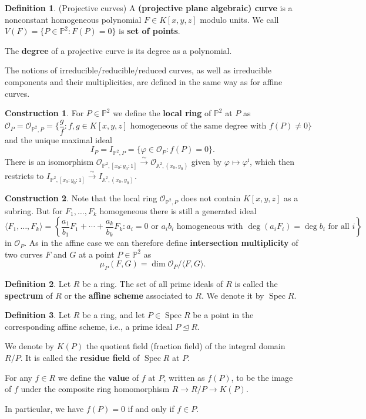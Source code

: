 \documentclass[12pt]{article}
\newlength{\myparskip}
\newenvironment{fullbox}{\begin{lrbox}{\savefullbox}\begin{minipage}{\dimexpr\textwidth-2\fboxsep\relax}\setlength{\parskip}{\myparskip}}{\end{minipage}\end{lrbox}\framebox[\textwidth]{\usebox{\savefullbox}}}
\theoremstyle{definition}
\newtheorem{defn}{Definition}
\newtheorem{construction}{Construction}
\newenvironment{bdefn}{\begin{fullbox}\begin{defn}}{\end{defn}\end{fullbox}}
\renewcommand{\phi}{\varphi}
\newcommand{\<}{\langle}
\renewcommand{\>}{\rangle}
\newcommand{\A}{\mathbb{A}}
\renewcommand{\P}{\mathbb{P}}
\renewcommand{\O}{\mathscr{O}}
\newcommand{\teq}{\trianglelefteq}
\DeclareMathOperator{\Spec}{Spec}
\begin{document}
\begin{defn}(Projective curves)
    A \textbf{(projective plane algebraic) curve} is a nonconstant homogeneous polynomial $F \in K[x, y, z]$ modulo units. We call $V(F) = \{P \in \P^2 : F(P) = 0\}$ is \textbf{set of points}.

    The \textbf{degree} of a projective curve is its degree as a polynomial.

    The notions of irreducible/reducible/reduced curves, as well as irreducible components and their multiplicities, are defined in the same way as for affine curves. 
\end{defn}


\begin{construction}
    For $P \in \P^2$ we define the \textbf{local ring} of $\P^2$ at $P$ as
    \[
        \O_P = \O_{\P^2, P} = \{\frac{g}{f} : f, g \in K[x, y, z] \text{ homogeneous of the same degree with } f(P) \ne 0\}
    \]
    and the unique maximal ideal
    \[
        I_P = I_{\P^2, P} = \{\phi \in \O_P : f(P) = 0\}.
    \]
    There is an isomorphism $\O_{\P^2, [x_0 : y_0 : 1]} \xrightarrow{\sim} \O_{\A^2, (x_0, y_0)}$ given by $\phi \mapsto \phi^{\mathrm{i}}$, which then restricts to $I_{\P^2, [x_0 : y_0 : 1]} \xrightarrow{\sim} I_{\A^2, (x_0, y_0)}$.
\end{construction}




\begin{construction}
    Note that the local ring $\O_{\P^2, P}$ does not contain $K[x, y, z]$ as a subring. But for $F_1, \dots, F_k$ homogeneous there is still a generated ideal
    \[
        \<F_1, \dots, F_k\> = \left\{\frac{a_1}{b_1}F_1 + \cdots + \frac{a_k}{b_k}F_k : a_i = 0 \text{ or $a_ib_i$ homogeneous with $\deg(a_iF_i) = \deg b_i$ for all $i$}\right\}
    \]
    in $\O_P$. As in the affine case we can therefore define \textbf{intersection multiplicity} of two curves $F$ and $G$ at a point $P \in \P^2$ as
    \[
        \mu_P(F, G) = \dim \O_P/\<F, G\>.
    \]
\end{construction}


\newpage



\begin{bdefn}
    Let $R$ be a ring. The set of all prime ideals of $R$ is called the \textbf{spectrum} of $R$ or the \textbf{affine scheme} associated to $R$. We denote it by $\Spec R$.
\end{bdefn}

\begin{bdefn}
    Let $R$ be a ring, and let $P \in \Spec R$ be a point in the corresponding affine scheme, i.e., a prime ideal $P \teq R$.

    We denote by $K(P)$ the quotient field (fraction field) of the integral domain $R/P$. It is called the \textbf{residue field} of $\Spec R$ at $P$.

    For any $f \in R$ we define the \textbf{value} of $f$ at $P$, written as $f(P)$, to be the image of $f$ under the composite ring homomorphism $R \to R/P \to K(P)$.

    In particular, we have $f(P) = 0$ if and only if $f \in P$.
\end{bdefn}
\end{document}
